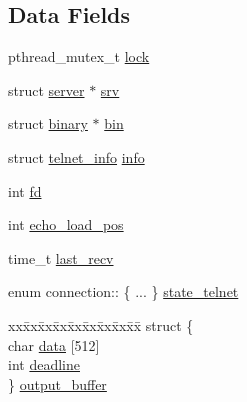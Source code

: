 \subsection*{Data Fields}
\begin{DoxyCompactItemize}
\item 
pthread\+\_\+mutex\+\_\+t \hyperlink{structconnection_a0abaf4b5d42c4e5d19190035fade3599}{lock}
\item 
struct \hyperlink{structserver}{server} $\ast$ \hyperlink{structconnection_a1b6916fd6bd625513f86cc35333623c9}{srv}
\item 
struct \hyperlink{structbinary}{binary} $\ast$ \hyperlink{structconnection_a09081b9b889d057bcf9376214ea9bfaf}{bin}
\item 
struct \hyperlink{structtelnet__info}{telnet\+\_\+info} \hyperlink{structconnection_ae0e5788a0922fcf7ea0e1f73b5fcbea7}{info}
\item 
int \hyperlink{structconnection_a6f8059414f0228f0256115e024eeed4b}{fd}
\item 
int \hyperlink{structconnection_ad1e04a9c082c6992a98a404842e4662c}{echo\+\_\+load\+\_\+pos}
\item 
time\+\_\+t \hyperlink{structconnection_a2d8aa7cb65467972a3e2979501154f95}{last\+\_\+recv}
\item 
enum connection\+:: \{ ... \}  \hyperlink{structconnection_a86edf08e7089b8c6cb5e37b284913496}{state\+\_\+telnet}
\item 
\begin{tabbing}
xx\=xx\=xx\=xx\=xx\=xx\=xx\=xx\=xx\=\kill
struct \{\\
\>char \hyperlink{structconnection_a5233f4a930689daddd3ad8ef607eba2d}{data} \mbox{[}512\mbox{]}\\
\>int \hyperlink{structconnection_a30d410aac9d815897af98403ade9fc25}{deadline}\\
\} \hyperlink{structconnection_a48fdd11f6626fbc7383519e83d1e1851}{output\_buffer}\\


\end{tabbing}
\end{DoxyCompactItemize}
